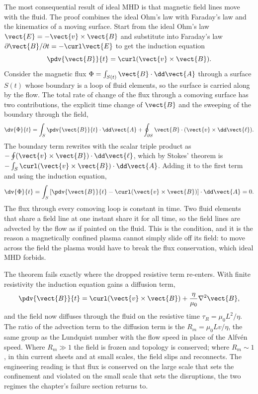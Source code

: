 The most consequential result of ideal MHD is that magnetic field lines move
with the fluid. The proof combines the ideal Ohm's law with Faraday's law
and the kinematics of a moving surface. Start from the ideal Ohm's law
$\vect{E} = -\vect{v}\times\vect{B}$ and substitute into Faraday's law
$\partial\vect{B}/\partial t = -\curl\vect{E}$ to get the induction equation
\[
\pdv{\vect{B}}{t} = \curl(\vect{v}\times\vect{B}).
\]
Consider the magnetic flux $\Phi = \int_{S(t)}\vect{B}\cdot\dd\vect{A}$
through a surface $S(t)$ whose boundary is a loop of fluid elements, so the
surface is carried along by the flow. The total rate of change of the flux
through a comoving surface has two contributions, the explicit time change
of $\vect{B}$ and the sweeping of the boundary through the field,
\[
\dv{\Phi}{t}
= \int_{S}\pdv{\vect{B}}{t}\cdot\dd\vect{A}
+ \oint_{\partial S}\vect{B}\cdot(\vect{v}\times\dd\vect{\ell}).
\]
The boundary term rewrites with the scalar triple product as $-\oint(\vect{v}
\times\vect{B})\cdot\dd\vect{\ell}$, which by Stokes' theorem is
$-\int_{S}\curl(\vect{v}\times\vect{B})\cdot\dd\vect{A}$. Adding it to the
first term and using the induction equation,
\[
\dv{\Phi}{t}
= \int_{S}\left[\pdv{\vect{B}}{t}
- \curl(\vect{v}\times\vect{B})\right]\cdot\dd\vect{A} = 0.
\]
The flux through every comoving loop is constant in time. Two fluid elements
that share a field line at one instant share it for all time, so the field
lines are advected by the flow as if painted on the fluid. This is the
 condition, and it is the reason a magnetically confined
plasma cannot simply slide off its field: to move across the field the
plasma would have to break the flux conservation, which ideal MHD forbids.

The theorem fails exactly where the dropped resistive term re-enters. With
finite resistivity the induction equation gains a diffusion term,
\[
\pdv{\vect{B}}{t} = \curl(\vect{v}\times\vect{B})
+ \frac{\eta}{\mu_{0}}\nabla^{2}\vect{B},
\]
and the field now diffuses through the fluid on the resistive time
$\tau_{R} = \mu_{0}L^{2}/\eta$. The ratio of the advection term to the
diffusion term is the  $R_{m} = \mu_{0}Lv/
\eta$, the same group as the Lundquist number with the flow speed in place of
the Alfv\'en speed. Where $R_{m}\gg 1$ the field is frozen and topology is
conserved; where $R_{m}\sim 1$, in thin current sheets and at small scales,
the field slips and reconnects. The engineering reading is that flux is
conserved on the large scale that sets the confinement and violated on the
small scale that sets the disruptions, the two regimes the chapter's failure
section returns to.

